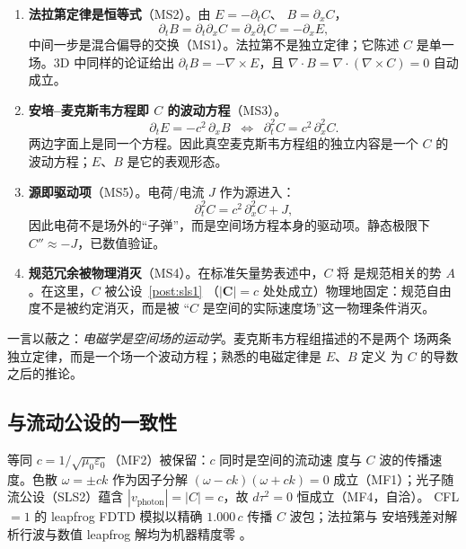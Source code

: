 \documentclass[aps,prd,preprint,superscriptaddress,amsmath,amssymb]{revtex4-2}
\begin{document}
\begin{enumerate}
  \item \textbf{法拉第定律是恒等式}（MS2）。由 $E=-\partial_t C$、
  $B=\partial_x C$，
  \begin{equation}
  \partial_t B = \partial_t\partial_x C = \partial_x\partial_t C = -\partial_x E ,
  \end{equation}
  中间一步是混合偏导的交换（MS1）。法拉第不是独立定律；它陈述 $C$ 是单一
  场。3D 中同样的论证给出 $\partial_t B = -\nabla\times E$，且
  $\nabla\cdot B = \nabla\cdot(\nabla\times C)=0$ 自动成立。

  \item \textbf{安培--麦克斯韦方程即 $C$ 的波动方程}（MS3）。
  \begin{equation}
  \partial_t E = -c^2\,\partial_x B
  \;\;\Longleftrightarrow\;\;
  \partial_t^2 C = c^2\,\partial_x^2 C .
  \end{equation}
  两边字面上是同一个方程。因此真空麦克斯韦方程组的独立内容是一个 $C$ 的
  波动方程；$E$、$B$ 是它的表观形态。

  \item \textbf{源即驱动项}（MS5）。电荷/电流 $J$ 作为源进入：
  \begin{equation}
  \partial_t^2 C = c^2\,\partial_x^2 C + J ,
  \end{equation}
  因此电荷不是场外的``子弹''，而是空间场方程本身的驱动项。静态极限下
  $C''\approx -J$，已数值验证。

  \item \textbf{规范冗余被物理消灭}（MS4）。在标准矢量势表述中，$C$ 将
  是规范相关的势 $A$。在这里，$C$ 被公设~\ref{post:sls1}
  （$|\bm{C}|=c$ 处处成立）物理地固定：规范自由度不是被约定消灭，而是被
  ``$C$ 是空间的实际速度场''这一物理条件消灭。
\end{enumerate}

一言以蔽之：\emph{电磁学是空间场的运动学}。麦克斯韦方程组描述的不是两个
场两条独立定律，而是一个场一个波动方程；熟悉的电磁定律是 $E$、$B$ 定义
为 $C$ 的导数之后的推论。

\subsection{与流动公设的一致性}

等同 $c=1/\sqrt{\mu_0\varepsilon_0}$（MF2）被保留：$c$ 同时是空间的流动速
度与 $C$ 波的传播速度。色散 $\omega=\pm ck$ 作为因子分解
$(\omega-ck)(\omega+ck)=0$ 成立（MF1）；光子随流公设（SLS2）蕴含
$|v_{\mathrm{photon}}|=|C|=c$，故 $d\tau^2=0$ 恒成立（MF4，自洽）。
CFL$=1$ 的 leapfrog FDTD 模拟以精确 $1.000\,c$ 传播 $C$ 波包；法拉第与
安培残差对解析行波与数值 leapfrog 解均为机器精度零 \cite{ProjectionPhysics-MS}。
\end{document}
